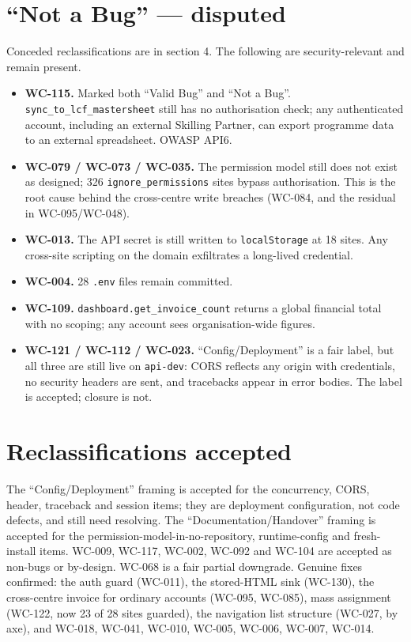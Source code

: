 \documentclass[11pt]{article}
\newcommand{\wc}[1]{\mbox{WC-#1}}
\begin{document}
\section{``Not a Bug'' --- disputed}
Conceded reclassifications are in section 4. The following are security-relevant and remain present.
\begin{itemize}
  \item \textbf{\wc{115}.} Marked both ``Valid Bug'' and ``Not a Bug''. \texttt{sync\_to\_lcf\_mastersheet}
        still has no authorisation check; any authenticated account, including an external Skilling
        Partner, can export programme data to an external spreadsheet. OWASP API6.
  \item \textbf{\wc{079} / \wc{073} / \wc{035}.} The permission model still does not exist as designed;
        326 \texttt{ignore\_permissions} sites bypass authorisation. This is the root cause behind the
        cross-centre write breaches (\wc{084}, and the residual in \wc{095}/\wc{048}).
  \item \textbf{\wc{013}.} The API secret is still written to \texttt{localStorage} at 18 sites. Any
        cross-site scripting on the domain exfiltrates a long-lived credential.
  \item \textbf{\wc{004}.} 28 \texttt{.env} files remain committed.
  \item \textbf{\wc{109}.} \texttt{dashboard.get\_invoice\_count} returns a global financial total with
        no scoping; any account sees organisation-wide figures.
  \item \textbf{\wc{121} / \wc{112} / \wc{023}.} ``Config/Deployment'' is a fair label, but all three are
        still live on \texttt{api-dev}: CORS reflects any origin with credentials, no security headers
        are sent, and tracebacks appear in error bodies. The label is accepted; closure is not.
\end{itemize}

\section{Reclassifications accepted}
The ``Config/Deployment'' framing is accepted for the concurrency, CORS, header, traceback and session
items; they are deployment configuration, not code defects, and still need resolving. The
``Documentation/Handover'' framing is accepted for the permission-model-in-no-repository, runtime-config
and fresh-install items. \wc{009}, \wc{117}, \wc{002}, \wc{092} and \wc{104} are accepted as non-bugs
or by-design. \wc{068} is a fair partial downgrade. Genuine fixes confirmed: the auth guard (\wc{011}),
the stored-HTML sink (\wc{130}), the cross-centre invoice for ordinary accounts (\wc{095}, \wc{085}),
mass assignment (\wc{122}, now 23 of 28 sites guarded), the navigation list structure (\wc{027}, by axe),
and \wc{018}, \wc{041}, \wc{010}, \wc{005}, \wc{006}, \wc{007}, \wc{014}.
\end{document}
